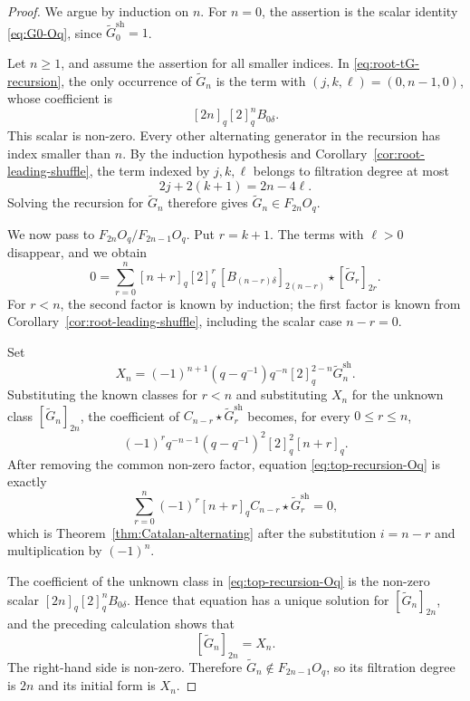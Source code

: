 \documentclass[11pt]{extarticle}
\theoremstyle{definition}
\theoremstyle{remark}
\numberwithin{equation}{section}
\newcommand{\Oq}{O_q}
\newcommand{\sh}{\mathrm{sh}}
\begin{document}
\begin{proof}
We argue by induction on $n$.  For $n=0$, the assertion is the scalar
identity \eqref{eq:G0-Oq}, since $\widetilde G_0^{\sh}=1$.

Let $n\geq1$, and assume the assertion for all smaller indices.  In
\eqref{eq:root-tG-recursion}, the only occurrence of $\widetilde G_n$ is
the term with $(j,k,\ell)=(0,n-1,0)$, whose coefficient is
\[
        [2n]_q[2]_q^nB_{0\delta}.
\]
This scalar is non-zero.  Every other alternating generator in the recursion
has index smaller than $n$.  By the induction hypothesis and
Corollary~\ref{cor:root-leading-shuffle}, the term indexed by
$j,k,\ell$ belongs to filtration degree at most
\[
        2j+2(k+1)=2n-4\ell.
\]
Solving the recursion for $\widetilde G_n$ therefore gives
$\widetilde G_n\in F_{2n}\Oq$.

We now pass to $F_{2n}\Oq/F_{2n-1}\Oq$.  Put $r=k+1$.  The terms with
$\ell>0$ disappear, and we obtain
\begin{equation}
\label{eq:top-recursion-Oq}
0=
\sum_{r=0}^{n}
[n+r]_q[2]_q^r\,
[ B_{(n-r)\delta}]_{2(n-r)}\star
[\widetilde G_r]_{2r}.
\end{equation}
For $r<n$, the second factor is known by induction; the first factor is
known from Corollary~\ref{cor:root-leading-shuffle}, including the scalar
case $n-r=0$.

Set
\[
        X_n=
        (-1)^{n+1}(q-q^{-1})q^{-n}[2]_q^{2-n}
        \widetilde G_n^{\sh}.
\]
Substituting the known classes for $r<n$ and substituting $X_n$ for the
unknown class $[\widetilde G_n]_{2n}$, the coefficient of
$C_{n-r}\star\widetilde G_r^{\sh}$ becomes, for every $0\leq r\leq n$,
\[
        (-1)^r q^{-n-1}(q-q^{-1})^2[2]_q^2[n+r]_q.
\]
After removing the common non-zero factor, equation
\eqref{eq:top-recursion-Oq} is exactly
\[
        \sum_{r=0}^{n}(-1)^r[n+r]_q
        C_{n-r}\star\widetilde G_r^{\sh}=0,
\]
which is Theorem~\ref{thm:Catalan-alternating} after the substitution
$i=n-r$ and multiplication by $(-1)^n$.

The coefficient of the unknown class in
\eqref{eq:top-recursion-Oq} is the non-zero scalar
$[2n]_q[2]_q^nB_{0\delta}$.  Hence that equation has a unique solution for
$[\widetilde G_n]_{2n}$, and the preceding calculation shows that
\[
        [\widetilde G_n]_{2n}=X_n.
\]
The right-hand side is non-zero.  Therefore
$\widetilde G_n\notin F_{2n-1}\Oq$, so its filtration degree is $2n$ and
its initial form is $X_n$.
\end{proof}
\end{document}
